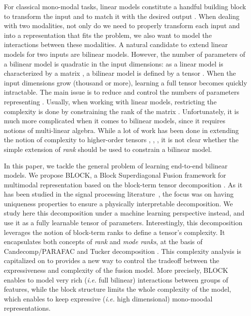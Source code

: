 \documentclass[letterpaper]{article} \usepackage{aaai19}  \usepackage{times}  \usepackage{helvet}  \usepackage{courier}  \usepackage{url}  \usepackage{graphicx}  \usepackage{booktabs}       \usepackage{comment}
\begin{document}
For classical mono-modal tasks, linear models constitute a handful building block to transform the input  and to match it with the desired output . When dealing with two modalities, not only do we need to properly transform each input  and  into a representation that fits the problem, we also want to model the interactions between these modalities. 
A natural candidate to extend linear models for two inputs are bilinear models. However, the number of parameters of a bilinear model is quadratic in the input dimensions: as a linear model is characterized by a matrix , a bilinear model is defined by a tensor . When the input dimensions grow  (thousand or more), learning a full tensor  becomes quickly intractable.
The main issue is to reduce and control the numbers of parameters representing . Usually, when working with linear models, restricting the complexity is done by constraining the rank of the matrix . Unfortunately, it is much more complicated when it comes to bilinear models, since it requires notions of multi-linear algebra. While a lot of work has been done in extending the notion of complexity to higher-order tensors \cite{Harshman2001FoundationsOT}, \cite{Carroll1970}, \cite{Tucker1966}, it is not clear whether the simple extension of \textit{rank} should be used to constrain a bilinear model. 

In this paper, we tackle the general problem of learning end-to-end bilinear models. We propose BLOCK, a Block Superdiagonal Fusion framework for multimodal representation based on the block-term tensor decomposition \cite{De08f}. As it has been studied in the signal processing literature~\cite{Cichocki2015TensorDF}, the focus was on having uniqueness properties to ensure a physically interpretable decomposition. We study here this decomposition under a machine learning perspective instead, and use it as a fully learnable tensor of parameters. Interestingly, this decomposition leverages the notion of block-term ranks to define a tensor's complexity. It encapsulates both concepts of \textit{rank} and \textit{mode ranks}, at the basis of Candecomp/PARAFAC \cite{Harshman2001FoundationsOT} and Tucker decomposition \cite{Tucker1966}. This complexity analysis is capitalized on to provides a new way to control the tradeoff between the expressiveness and complexity of the fusion model. More precisely, BLOCK enables to model very rich (\textit{i.e.} full bilinear) interactions between groups of features, while the block structure limits the whole complexity of the model, which enables to keep expressive (\textit{i.e.} high dimensional) mono-moodal representations. 
\end{document}
